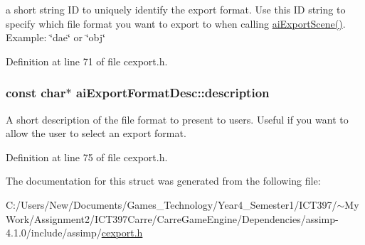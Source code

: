 a short string ID to uniquely identify the export format. Use this ID string to specify which file format you want to export to when calling \hyperlink{cexport_8h_9615510b8430a9da4f435a72148128dd}{aiExportScene()}. Example: \char`\"{}dae\char`\"{} or \char`\"{}obj\char`\"{} 

Definition at line 71 of file cexport.h.\hypertarget{structai_export_format_desc_9c84c4b07c5177fb6539b9bdf90236fb}{
\subsubsection[description]{\setlength{\rightskip}{0pt plus 5cm}const char$\ast$ {\bf aiExportFormatDesc::description}}}
\label{structai_export_format_desc_9c84c4b07c5177fb6539b9bdf90236fb}


A short description of the file format to present to users. Useful if you want to allow the user to select an export format. 

Definition at line 75 of file cexport.h.

The documentation for this struct was generated from the following file:\begin{CompactItemize}
\item 
C:/Users/New/Documents/Games\_\-Technology/Year4\_\-Semester1/ICT397/$\sim$My Work/Assignment2/ICT397Carre/CarreGameEngine/Dependencies/assimp-4.1.0/include/assimp/\hyperlink{cexport_8h}{cexport.h}\end{CompactItemize}
